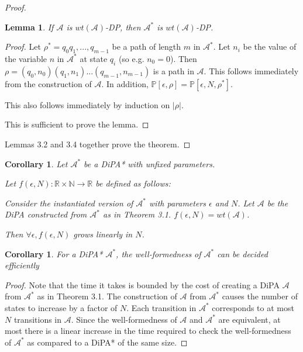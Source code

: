 \documentclass[12pt]{article}
\newcommand{\NN}{\mathbb{N}}
\newcommand{\RR}{\mathbb{R}}
\newcommand{\PP}{\mathbb{P}}
\newtheorem{lemma}[thm]{Lemma}
\newtheorem{cor}[thm]{Corollary}
\theoremstyle{definition}
\begin{document}
\begin{proof}
\begin{lemma}
	If $\mathcal{A}$ is $wt(\mathcal{A})$-DP, then $\mathcal{A}^*$ is $wt(\mathcal{A})$-DP.
\end{lemma}


\begin{proof}
	Let $\rho^* = q_0q_1,...,q_{m-1}$ be a path of length $m$ in $\mathcal{A}^*$. Let $n_i$ be the value of the variable $n$ in $\mathcal{A}^*$ at state $q_i$ (so e.g. $n_0 = 0$). Then $\rho = (q_0, n_0)(q_1, n_1)...(q_{m-1}, n_{m-1})$ is a path in $\mathcal{A}$. This follows immediately from the construction of $\mathcal{A}$. In addition, $\PP[\epsilon, \rho] = \PP[\epsilon, N, \rho^*]$. 	
	
	This also follows immediately by induction on $|\rho|$.

	This is sufficient to prove the lemma. 
\end{proof}

Lemmas 3.2 and 3.4 together prove the theorem. 
\end{proof}

\begin{cor}	

	Let $\mathcal{A}^*$ be a DiPA* with unfixed parameters.

	Let $f(\epsilon, N):\RR\times \NN \to \RR$ be defined as follows:

	Consider the instantiated version of $\mathcal{A}^*$ with parameters $\epsilon$ and $N$. Let $\mathcal{A}$ be the DiPA constructed from $\mathcal{A}^*$ as in Theorem 3.1. $f(\epsilon, N) = wt(\mathcal{A})$.


	Then $\forall \epsilon, f(\epsilon, N)$ grows linearly in $N$.
\end{cor}

\begin{cor}
	For a DiPA* $\mathcal{A}^*$, the well-formedness of $\mathcal{A}^*$ can be decided efficiently
\end{cor}
\begin{proof}
	Note that the time it takes is bounded by the cost of creating a DiPA $\mathcal{A}$ from $\mathcal{A}^*$ as in Theorem 3.1. The construction of $\mathcal{A}$ from $\mathcal{A}^*$ causes the number of states to increase by a factor of $N$. 
	Each transition in $\mathcal{A}^*$ corresponds to at most $N$ transitions in $\mathcal{A}$. Since the well-formedness of $\mathcal{A}$ and $\mathcal{A}^*$ are equivalent, at most there is a linear increase in the time required to check the well-formedness of $\mathcal{A}^*$ as compared to a DiPA* of the same size.
\end{proof}


\end{document}
